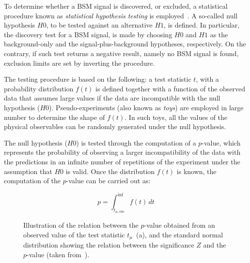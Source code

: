 			To determine whether a \ac{BSM} signal is discovered, or excluded, a statistical procedure known as \emph{statistical hypothesis testing} is employed~\cite{Cowan2015}. A so-called null hypothesis $H0$, to be tested against an alternative $H1$, is defined. In particular, the discovery test for a \ac{BSM} signal, is made by choosing $H0$ and $H1$ as the background-only and the signal-plus-background hypotheses, respectively. On the contrary, if such test returns a negative result, namely no \ac{BSM} signal is found, exclusion limits are set by inverting the procedure. 

			The testing procedure is based on the following: a test statistic $t$, with a probability distribution $f(t)$ is defined together with a function of the observed data that assumes large values if the data are incompatible with the null hypothesis ($H0$). Pseudo-experiments (also known as \emph{toys}) are employed in large number to determine the shape of $f(t)$. In such toys, all the values of the physical observables can be randomly generated under the null hypothesis. %

			The null hypothesis ($H0$) is tested through the computation of a $p$-value, which represents the probability of observing a larger incompatibility of the data with the predictions in an infinite number of repetitions of the experiment under the assumption that $H0$ is valid. Once the distribution $f(t)$ is known, the computation of the $p$-value can be carried out as:

			\begin{equation}
				p = \int_{t_{\mu,\mathrm{obs}}}^{\inf} f(t)\,dt
 			\label{eq:pvalue}
			\end{equation}

			\begin{figure}[!htb]
				\centering
					\hspace{0.05\textwidth}
					\hspace{0.05\textwidth}
				\caption{Illustration of the relation between the $p$-value obtained from an observed value of the test statistic $t_{\mu}$~(a), and the standard normal distribution showing the relation between the significance $Z$ and the $p$-value (taken from~\cite{Cowan:2010js}).}
				\label{fig:pval-sig}
			\end{figure}

